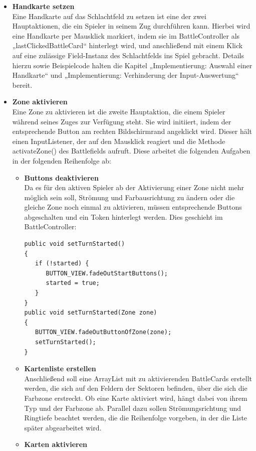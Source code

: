 \begin{itemize}
\item \textbf{Handkarte setzen} \\
Eine Handkarte auf das Schlachtfeld zu setzen ist eine der zwei Hauptaktionen, die ein Spieler in seinem Zug durchführen kann. Hierbei wird eine Handkarte per Mausklick markiert, indem sie im BattleController als „lastClickedBattleCard“ hinterlegt wird, und anschließend mit einem Klick auf eine zulässige Field-Instanz des Schlachtfelds ins Spiel gebracht. Details hierzu sowie Beispielcode halten die Kapitel „Implementierung: Auswahl einer Handkarte“ und „Implementierung: Verhinderung der Input-Auswertung“ bereit.

\item \textbf{Zone aktivieren} \\
Eine Zone zu aktivieren ist die zweite Hauptaktion, die einem Spieler während seines Zuges zur Verfügung steht. Sie wird initiiert, indem der entsprechende Button am rechten Bildschirmrand angeklickt wird. Dieser hält einen InputListener, der auf den Mausklick reagiert und die Methode activateZone() des Battlefields aufruft. Diese arbeitet die folgenden Aufgaben in der folgenden Reihenfolge ab:
\begin{itemize}
\item \textbf{Buttons deaktivieren} \\
Da es für den aktiven Spieler ab der Aktivierung einer Zone nicht mehr möglich sein soll, Strömung und Farbausrichtung zu ändern oder die gleiche Zone noch einmal zu aktivieren, müssen entsprechende Buttons abgeschalten und ein Token hinterlegt werden. Dies geschieht im BattleController:
\begin{lstlisting}
public void setTurnStarted()
{
   if (!started) {
      BUTTON_VIEW.fadeOutStartButtons();
      started = true;
   }
}
public void setTurnStarted(Zone zone)
{
   BUTTON_VIEW.fadeOutButtonOfZone(zone);
   setTurnStarted();
}
\end{lstlisting}
\item \textbf{Kartenliste erstellen} \\
Anschließend soll eine ArrayList mit zu aktivierenden BattleCards erstellt werden, die sich auf den Feldern der Sektoren befinden, über die sich die Farbzone erstreckt. Ob eine Karte aktiviert wird, hängt dabei von ihrem Typ und der Farbzone ab. Parallel dazu sollen Strömungsrichtung und Ringtiefe beachtet werden, die die Reihenfolge vorgeben, in der die Liste später abgearbeitet wird.
\item \textbf{Karten aktivieren} \\

\end{itemize}
\end{itemize}
